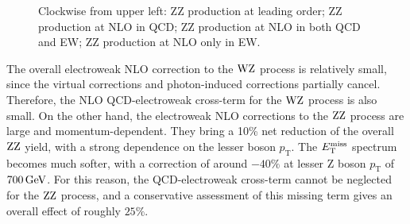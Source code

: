 \begin{figure}[hb]
 \caption{Clockwise from upper left: ZZ production at leading order; ZZ production at NLO in QCD; ZZ production at NLO in both QCD and EW; ZZ production at NLO only in EW.} \label{fig:ZZto4l}
\end{figure}

The overall electroweak NLO correction to the $\mathrm{W}\mathrm{Z}$ process is relatively small, since the virtual corrections and photon-induced corrections partially cancel.
Therefore, the NLO QCD-electroweak cross-term for the $\mathrm{W}\mathrm{Z}$ process is also small.
On the other hand, the electroweak NLO corrections to the $\mathrm{Z}\mathrm{Z}$ process are large and momentum-dependent.
They bring a 10\% net reduction of the overall $\mathrm{Z}\mathrm{Z}$ yield, with a strong dependence on the lesser boson $p_\mathrm{T}$.
The $E_\mathrm{T}^{\mathrm{miss}}$ spectrum becomes much softer, with a correction of around $-40\%$ at lesser Z boson $p_\mathrm{T}$ of $700 \,\text{Ge\hspace{-.08em}V}$.
For this reason, the QCD-electroweak cross-term cannot be neglected for the $\mathrm{Z}\mathrm{Z}$ process, and a conservative
assessment of this missing term gives an overall effect of roughly $25\%$.

